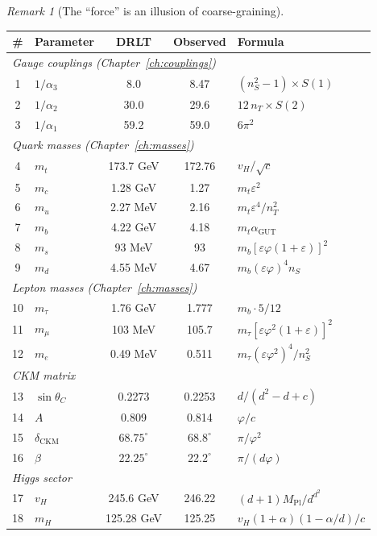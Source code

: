 \documentclass[12pt]{article}
\theoremstyle{remark}
\newtheorem{remark}[theorem]{Remark}
\theoremstyle{definition}
\begin{document}
\begin{remark}[The ``force'' is an illusion of coarse-graining]
\begin{center}
\small
\begin{tabular}{clccl}
\hline
\# & Parameter & DRLT & Observed & Formula \\
\hline
\multicolumn{5}{l}{\emph{Gauge couplings (Chapter~\ref{ch:couplings})}} \\
1 & $1/\alpha_3$ & 8.0 & 8.47 & $(n_S^2-1) \times S(1)$ \\
2 & $1/\alpha_2$ & 30.0 & 29.6 & $12\,n_T \times S(2)$ \\
3 & $1/\alpha_1$ & 59.2 & 59.0 & $6\pi^2$ \\
\hline
\multicolumn{5}{l}{\emph{Quark masses (Chapter~\ref{ch:masses})}} \\
4 & $m_t$ & 173.7 GeV & 172.76 & $v_H/\sqrt{c}$ \\
5 & $m_c$ & 1.28 GeV & 1.27 & $m_t\varepsilon^2$ \\
6 & $m_u$ & 2.27 MeV & 2.16 & $m_t\varepsilon^4/n_T^2$ \\
7 & $m_b$ & 4.22 GeV & 4.18 & $m_t\alpha_\text{GUT}$ \\
8 & $m_s$ & 93 MeV & 93 & $m_b[\varepsilon\varphi(1\!+\!\varepsilon)]^2$ \\
9 & $m_d$ & 4.55 MeV & 4.67 & $m_b(\varepsilon\varphi)^4 n_S$ \\
\hline
\multicolumn{5}{l}{\emph{Lepton masses (Chapter~\ref{ch:masses})}} \\
10 & $m_\tau$ & 1.76 GeV & 1.777 & $m_b \cdot 5/12$ \\
11 & $m_\mu$ & 103 MeV & 105.7 & $m_\tau[\varepsilon\varphi^2(1\!+\!\varepsilon)]^2$ \\
12 & $m_e$ & 0.49 MeV & 0.511 & $m_\tau(\varepsilon\varphi^2)^4/n_S^2$ \\
\hline
\multicolumn{5}{l}{\emph{CKM matrix}} \\
13 & $\sin\theta_C$ & 0.2273 & 0.2253 & $d/(d^2\!-\!d\!+\!c)$ \\
14 & $A$ & 0.809 & 0.814 & $\varphi/c$ \\
15 & $\delta_\text{CKM}$ & $68.75^\circ$ & $68.8^\circ$ & $\pi/\varphi^2$ \\
16 & $\beta$ & $22.25^\circ$ & $22.2^\circ$ & $\pi/(d\varphi)$ \\
\hline
\multicolumn{5}{l}{\emph{Higgs sector}} \\
17 & $v_H$ & 245.6 GeV & 246.22 & $(d\!+\!1)M_\text{Pl}/d^{d^2}$ \\
18 & $m_H$ & 125.28 GeV & 125.25 & $v_H(1\!+\!\alpha)(1\!-\!\alpha/d)/c$ \\

\end{tabular}
\end{center}
\end{remark}
\end{document}
